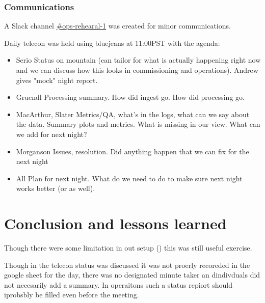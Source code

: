 \subsubsection{Communications }


A Slack channel \href{https://lsstc.slack.com/messages/CJBSY6FUN}{\#ops-rehearal-1}  was created
for minor communications.

Daily telecon was held using bluejeans at 11:00PST with the agenda:
\begin{itemize}
\item Serio	Status on mountain (can tailor for what is actually happening right now and we can discuss how this looks in commissioning and operations). Andrew gives "mock" night report.
\item Gruendl 	Processing summary. How did ingest go. How did processing go.
\item MacArthur, Slater	Metrics/QA, what's in the logs, what can we say about the data. Summary plots and metrics. What is missing in our view. What can we add for next night?
\item Morganson	Issues, resolution. Did anything happen that we can fix for the next night

\item All	Plan for next night. What do we need to do to make sure next night works better (or as well).
\end{itemize}







\section{Conclusion and lessons learned}\label{sec:conc}
Though there were some limitation in out setup () this was still useful exercise.

Though in the telecon status was discussed it was not proerly recoreded in the google sheet for the day,
there was no designated minute taker an dindivduals did not necesarily add a summary. In operaitons such a status
repiort should iprobsbly be filled even before the meeting.



